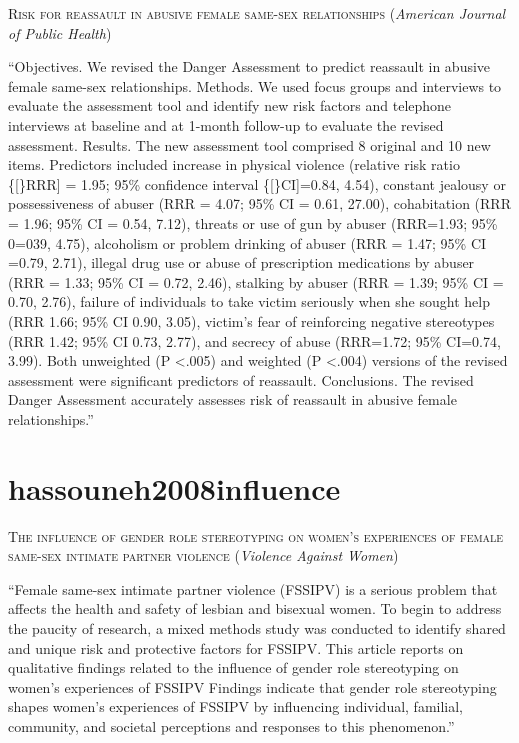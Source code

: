 \documentclass[]{tufte-handout}
\begin{document}
\textsc{\large{Risk for reassault in abusive female same-sex relationships}}
(\emph{American Journal of Public Health})

``Objectives. We revised the Danger Assessment to predict reassault in
abusive female same-sex relationships. Methods. We used focus groups and
interviews to evaluate the assessment tool and identify new risk factors
and telephone interviews at baseline and at 1-month follow-up to
evaluate the revised assessment. Results. The new assessment tool
comprised 8 original and 10 new items. Predictors included increase in
physical violence (relative risk ratio \{{[}\}RRR{]} = 1.95; 95\%
confidence interval \{{[}\}CI{]}=0.84, 4.54), constant jealousy or
possessiveness of abuser (RRR = 4.07; 95\% CI = 0.61, 27.00),
cohabitation (RRR = 1.96; 95\% CI = 0.54, 7.12), threats or use of gun
by abuser (RRR=1.93; 95\% 0=039, 4.75), alcoholism or problem drinking
of abuser (RRR = 1.47; 95\% CI =0.79, 2.71), illegal drug use or abuse
of prescription medications by abuser (RRR = 1.33; 95\% CI = 0.72,
2.46), stalking by abuser (RRR = 1.39; 95\% CI = 0.70, 2.76), failure of
individuals to take victim seriously when she sought help (RRR 1.66;
95\% CI 0.90, 3.05), victim's fear of reinforcing negative stereotypes
(RRR 1.42; 95\% CI 0.73, 2.77), and secrecy of abuse (RRR=1.72; 95\%
CI=0.74, 3.99). Both unweighted (P \textless{}.005) and weighted (P
\textless{}.004) versions of the revised assessment were significant
predictors of reassault. Conclusions. The revised Danger Assessment
accurately assesses risk of reassault in abusive female relationships.''

\section{\texorpdfstring{\textcolor[HTML]{5b0057}{hassouneh2008influence}}{}}\label{section-37}

\textsc{\large{The influence of gender role stereotyping on women's experiences of female same-sex intimate partner violence}}
(\emph{Violence Against Women})

``Female same-sex intimate partner violence (FSSIPV) is a serious
problem that affects the health and safety of lesbian and bisexual
women. To begin to address the paucity of research, a mixed methods
study was conducted to identify shared and unique risk and protective
factors for FSSIPV. This article reports on qualitative findings related
to the influence of gender role stereotyping on women's experiences of
FSSIPV Findings indicate that gender role stereotyping shapes women's
experiences of FSSIPV by influencing individual, familial, community,
and societal perceptions and responses to this phenomenon.''
\end{document}
